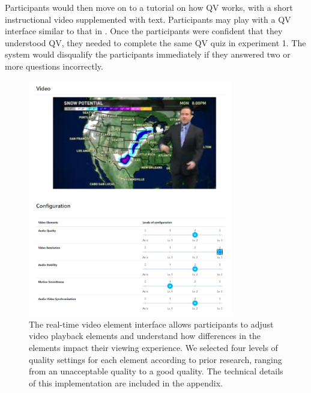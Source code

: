 Participants would then move on to a tutorial on how QV works, with a short instructional video supplemented with text. Participants may play with a QV interface similar to that in . Once the participants were confident that they understood QV, they needed to complete the same QV quiz in experiment 1. The system would disqualify the participants immediately if they answered two or more questions incorrectly.

\begin{figure}[htpb]
    \centering
    \includegraphics[width=0.8\textwidth, keepaspectratio=true]{content/image/video_playground.png}
    \caption{
        The real-time video element interface allows participants to adjust video playback elements and understand how differences in the elements impact their viewing experience. We selected four levels of quality settings for each element according to prior research, ranging from an unacceptable quality to a good quality. The technical details of this implementation are included in the appendix.
    }
    \label{fig:exp2_playground}
\end{figure}


